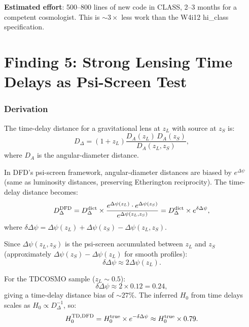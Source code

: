 \documentclass[11pt]{article}
\newcommand{\Dpsi}{\Delta\psi}
\begin{document}
\textbf{Estimated effort}: 500--800 lines of new code in CLASS,
2--3 months for a competent cosmologist.  This is $\sim 3\times$
less work than the W4i12 hi\_class specification.


\part{Finding 5: Strong Lensing Time Delays as Psi-Screen Test}
\label{sec:TDCOSMO}

\section{Derivation}

The time-delay distance for a gravitational lens at $z_L$ with source
at $z_S$ is:
\begin{equation}
D_\Delta = (1+z_L)\frac{D_A(z_L)\,D_A(z_S)}{D_A(z_L,z_S)},
\end{equation}
where $D_A$ is the angular-diameter distance.

In DFD's psi-screen framework, angular-diameter distances are biased by
$e^{\Dpsi}$ (same as luminosity distances, preserving Etherington
reciprocity).  The time-delay distance becomes:
\begin{equation}
D_\Delta^{\rm DFD} = D_\Delta^{\rm dict} \times
\frac{e^{\Dpsi(z_L)} \cdot e^{\Dpsi(z_S)}}{e^{\Dpsi(z_L,z_S)}}
= D_\Delta^{\rm dict} \times e^{\delta\Dpsi},
\end{equation}
where $\delta\Dpsi = \Dpsi(z_L) + \Dpsi(z_S) - \Dpsi(z_L,z_S)$.

Since $\Dpsi(z_L,z_S)$ is the psi-screen accumulated between $z_L$ and
$z_S$ (approximately $\Dpsi(z_S) - \Dpsi(z_L)$ for smooth profiles):
\begin{equation}
\delta\Dpsi \approx 2\Dpsi(z_L).
\end{equation}

For the TDCOSMO sample ($z_L \sim 0.5$):
\begin{equation}
\delta\Dpsi \approx 2 \times 0.12 = 0.24,
\end{equation}
giving a time-delay distance bias of $\sim 27\%$.  The inferred $H_0$
from time delays scales as $H_0 \propto D_\Delta^{-1}$, so:
\begin{equation}
H_0^{\rm TD,DFD} = H_0^{\rm true} \times e^{-\delta\Dpsi}
\approx H_0^{\rm true} \times 0.79.
\end{equation}
\end{document}
